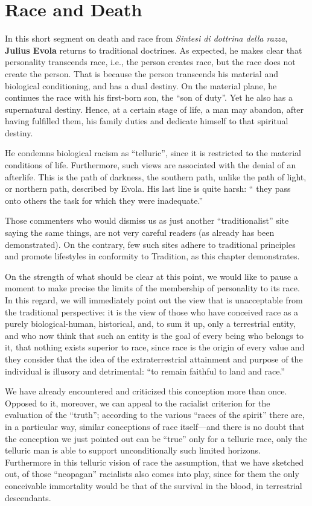 \section{Race and Death}

\begin{quotex}
In this short segment on death and race from \emph{Sintesi di dottrina della razza}, \textbf{Julius Evola} returns to traditional doctrines. As expected, he makes clear that personality transcends race, i.e., the person creates race, but the race does not create the person. That is because the person transcends his material and biological conditioning, and has a dual destiny. On the material plane, he continues the race with his first-born son, the ``son of duty''. Yet he also has a supernatural destiny. Hence, at a certain stage of life, a man may abandon, after having fulfilled them, his family duties and dedicate himself to that spiritual destiny.

He condemns biological racism as ``telluric'', since it is restricted to the material conditions of life. Furthermore, such views are associated with the denial of an afterlife. This is the path of darkness, the southern path, unlike the path of light, or northern path, described by Evola. His last line is quite harsh: `` they pass onto others the task for which they were inadequate.''

Those commenters who would dismiss us as just another ``traditionalist'' site saying the same things, are not very careful readers (as already has been demonstrated). On the contrary, few such sites adhere to traditional principles and promote lifestyles in conformity to Tradition, as this chapter demonstrates.
\end{quotex}


On the strength of what should be clear at this point, we would like to pause a moment to make precise the limits of the membership of personality to its race. In this regard, we will immediately point out the view that is unacceptable from the traditional perspective: it is the view of those who have conceived race as a purely biological-human, historical, and, to sum it up, only a terrestrial entity, and who now think that such an entity is the goal of every being who belongs to it, that nothing exists superior to race, since race is the origin of every value and they consider that the idea of the extraterrestrial attainment and purpose of the individual is illusory and detrimental: ``to remain faithful to land and race.''

We have already encountered and criticized this conception more than once. Opposed to it, moreover, we can appeal to the racialist criterion for the evaluation of the ``truth''; according to the various ``races of the spirit'' there are, in a particular way, similar conceptions of race itself---and there is no doubt that the conception we just pointed out can be ``true'' only for a telluric race, only the telluric man is able to support unconditionally such limited horizons. Furthermore in this telluric vision of race the assumption, that we have sketched out, of those ``neopagan'' racialists also comes into play, since for them the only conceivable immortality would be that of the survival in the blood, in terrestrial descendants.

